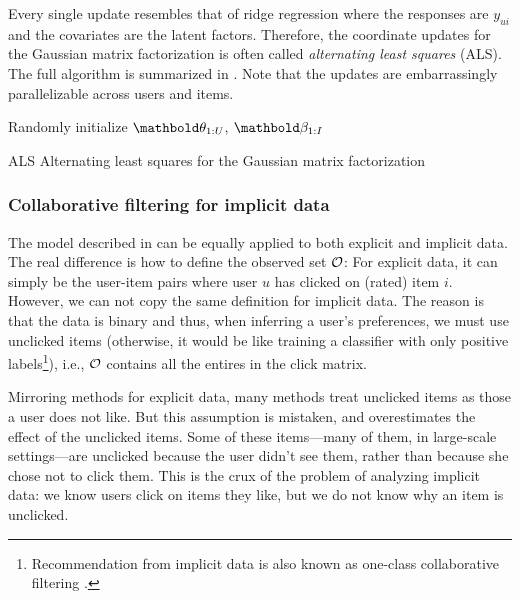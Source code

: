 Every single update resembles that of ridge regression \citep{friedman2001elements} where the responses are $y_{ui}$ and the covariates are the latent factors. Therefore, the coordinate updates for the Gaussian matrix factorization is often called \textit{alternating least squares} (ALS). The full algorithm is summarized in . Note that the updates are embarrassingly parallelizable across users and items. 

\begin{algorithm}
\DontPrintSemicolon %
Randomly initialize $\mb\theta_{1:U}$, $\mb\beta_{1:I}$\;
\;
\caption{{\sc ALS} Alternating least squares for the Gaussian matrix factorization}
\label{chpt:background:algo:gmf}
\end{algorithm}

\subsubsection{Collaborative filtering for implicit data} 
\label{chpt:background:sec:cf_implicit}

The model described in  can be equally applied to both explicit and implicit data. The real difference is how to define the observed set $\mathcal{O}$: For explicit data, it can simply be the user-item pairs where user $u$ has clicked on (rated) item $i$. However, we can not copy the same definition for implicit data. The reason is that the data is binary and thus, when inferring a user's preferences, we must use unclicked items (otherwise, it would be like training a classifier with only positive labels\footnote{Recommendation from implicit data is also known as one-class collaborative filtering \citep{pan2008one}.}), i.e., $\mathcal{O}$ contains all the entires in the click matrix. 

Mirroring methods for explicit data, many methods treat unclicked items as those a user does not like.  But this assumption is mistaken, and overestimates the effect of the unclicked items.  Some of these
items---many of them, in large-scale settings---are unclicked because
the user didn't see them, rather than because she chose not to
click them.  This is the crux of the problem of analyzing implicit
data: we know users click on items they like, but we do not know why
an item is unclicked.
	
